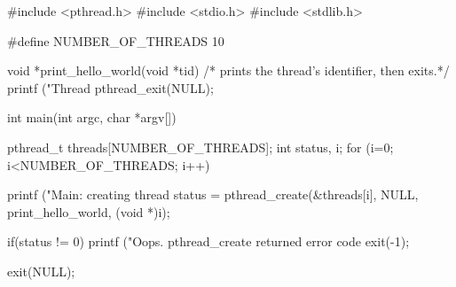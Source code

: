 \documentclass[varwidth=39em,crop]{standalone}
\begin{document}
\begin{ccode}
#include <pthread.h>
#include <stdio.h>
#include <stdlib.h>

#define NUMBER_OF_THREADS 10

void *print_hello_world(void *tid)
{
  /* prints the thread's identifier, then exits.*/
  printf ("Thread %
  pthread_exit(NULL);
}

int main(int argc, char *argv[])
{
  pthread_t threads[NUMBER_OF_THREADS];
  int status, i;
  for (i=0; i<NUMBER_OF_THREADS; i++)
    {
      printf ("Main: creating thread %
      status = pthread_create(&threads[i], NULL, print_hello_world, (void *)i);

      if(status != 0){
        printf ("Oops. pthread_create returned error code %
        exit(-1);
      }
    }
  exit(NULL);
}
\end{ccode}
\end{document}
